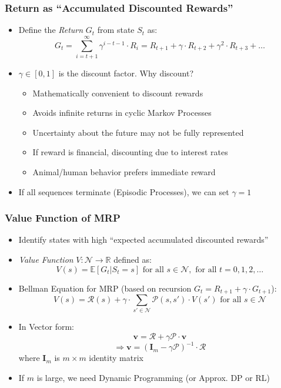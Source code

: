 \documentclass[handout]{beamer}
\begin{document}
\begin{frame}
\frametitle{Return as ``Accumulated Discounted Rewards''}
\pause
\begin{itemize}[<+->]
\item Define the {\em Return} $G_t$ from state $S_t$ as:
$$G_t = \sum_{i=t+1}^{\infty} \gamma^{i-t-1} \cdot R_i = R_{t+1} + \gamma \cdot R_{t+2} + \gamma^2 \cdot R_{t+3} + \ldots$$
\item $\gamma \in [0, 1]$ is the discount factor. Why discount?
\begin{itemize}
\item Mathematically convenient to discount rewards
\item Avoids infinite returns in cyclic Markov Processes
\item Uncertainty about the future may not be fully represented
\item If reward is financial, discounting due to interest rates
\item Animal/human behavior prefers immediate reward
\end{itemize}
\item If all sequences terminate (Episodic Processes), we can set $\gamma = 1$
\end{itemize}
\end{frame}

\begin{frame}
\frametitle{Value Function of MRP}
\pause
\begin{itemize}[<+->]
\item Identify states with high ``expected accumulated discounted rewards''
\item {\em Value Function} $V: \mathcal{N} \rightarrow \mathbb{R}$ defined as:
$$V(s) = \mathbb{E}[G_t|S_t=s] \text{ for all } s \in \mathcal{N}, \text{ for all } t = 0, 1, 2, \ldots$$
\item Bellman Equation for MRP (based on recursion $G_t = R_{t+1} + \gamma \cdot G_{t+1}$):
$$V(s) = \mathcal{R}(s) + \gamma \cdot \sum_{s' \in \mathcal{N}} \mathcal{P}(s, s') \cdot V(s') \text{ for all } s \in \mathcal{N}$$
\item In Vector form:
$$\bm{v} = \bm{\mathcal{R}} + \gamma \bm{\mathcal{P}} \cdot \bm{v}$$
$$\Rightarrow \bm{v} = (\bm{I}_m - \gamma \bm{\mathcal{P}})^{-1} \cdot \bm{\mathcal{R}}$$
where $\bm{I}_m$ is $m \times m$ identity matrix
\item If $m$ is large, we need Dynamic Programming (or Approx. DP or RL)
\end{itemize}
\end{frame}
\end{document}
